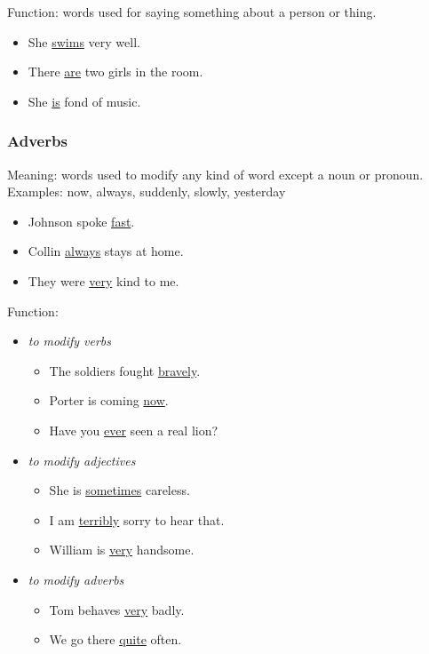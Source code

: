 Function: words used for saying something about a person or thing.
\begin{itemize}
    \item She \underline{swims} very well.
    \item There \underline{are} two girls in the room.
    \item She \underline{is} fond of music.
\end{itemize}

\subsubsection{Adverbs}
Meaning: words used to modify any kind of word except a noun or pronoun.
\newline
\newline
Examples: now, always, suddenly, slowly, yesterday
\begin{itemize}
    \item Johnson spoke \underline{fast}.
    \item Collin \underline{always} stays at home.
    \item They were \underline{very} kind to me.
\end{itemize}

Function:
\begin{itemize}
    \item {\it to modify verbs}
        \begin{itemize}
            \item The soldiers fought \underline{bravely}.
            \item Porter is coming \underline{now}.
            \item Have you \underline{ever} seen a real lion?
        \end{itemize}
    \item {\it to modify adjectives}
        \begin{itemize}
            \item She is \underline{sometimes} careless.
            \item I am \underline{terribly} sorry to hear that.
            \item William is \underline{very} handsome.
        \end{itemize}
    \item {\it to modify adverbs}
        \begin{itemize}
            \item Tom behaves \underline{very} badly.
            \item We go there \underline{quite} often.
        \end{itemize}
\end{itemize}

